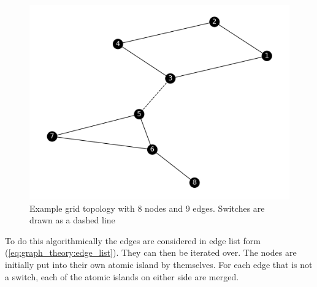 \begin{figure}[H]
    \begin{center}
        \includegraphics[width=.7\linewidth]{img/atomic_island.png}
    \end{center}
    \caption{
        Example grid topology with 8 nodes and 9 edges. Switches
        are drawn as a dashed line
    }
    \label{fig:data_prep:atomic_islands}
\end{figure}

To do this algorithmically the edges are considered in edge list
form (\ref{eq:graph_theory:edge_list}). They can then be iterated over.
The nodes are initially put into their own atomic island by themselves.
For each edge that is not a switch, each of the atomic islands on either
side are merged.

